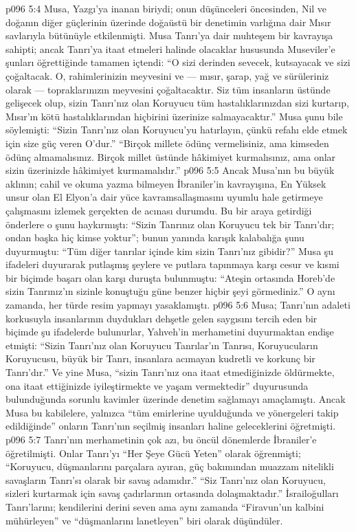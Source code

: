 \vs p096 5:4 Musa, Yazgı’ya inanan biriydi; onun düşünceleri öncesinden, Nil ve doğanın diğer güçlerinin üzerinde doğaüstü bir denetimin varlığına dair Mısır savlarıyla bütünüyle etkilenmişti. Musa Tanrı’ya dair muhteşem bir kavrayışa sahipti; ancak Tanrı’ya itaat etmeleri halinde olacaklar hususunda Museviler’e şunları öğrettiğinde tamamen içtendi: “O sizi derinden sevecek, kutsayacak ve sizi çoğaltacak. O, rahimlerinizin meyvesini ve --- mısır, şarap, yağ ve sürüleriniz olarak --- topraklarınızın meyvesini çoğaltacaktır. Siz tüm insanların üstünde gelişecek olup, sizin Tanrı’nız olan Koruyucu tüm hastalıklarınızdan sizi kurtarıp, Mısır’ın kötü hastalıklarından hiçbirini üzerinize salmayacaktır.” Musa şunu bile söylemişti: “Sizin Tanrı’nız olan Koruyucu’yu hatırlayın, çünkü refahı elde etmek için size güç veren O’dur.” “Birçok millete ödünç vermelisiniz, ama kimseden ödünç almamalısınız. Birçok millet üstünde hâkimiyet kurmalısınız, ama onlar sizin üzerinizde hâkimiyet kurmamalıdır.”
\vs p096 5:5 Ancak Musa’nın bu büyük aklının; cahil ve okuma yazma bilmeyen İbraniler’in kavrayışına, En Yüksek unsur olan El Elyon’a dair yüce kavramsallaşmasını uyumlu hale getirmeye çalışmasını izlemek gerçekten de acınası durumdu. Bu bir araya getirdiği önderlere o şunu haykırmıştı: “Sizin Tanrınız olan Koruyucu tek bir Tanrı’dır; ondan başka hiç kimse yoktur”; bunun yanında karışık kalabalığa şunu duyurmuştu: “Tüm diğer tanrılar içinde kim sizin Tanrı’nız gibidir?” Musa şu ifadeleri duyurarak putlaşmış şeylere ve putlara tapınmaya karşı cesur ve kısmi bir biçimde başarı olan karşı duruşta bulunmuştu: “Ateşin ortasında Horeb’de sizin Tanrınız’ın sizinle konuştuğu güne benzer hiçbir şeyi görmediniz.” O aynı zamanda, her türde resim yapmayı yasaklamıştı.
\vs p096 5:6 Musa; Tanrı’nın adaleti korkusuyla insanlarının duydukları dehşetle gelen saygısını tercih eden bir biçimde şu ifadelerde bulunurlar, Yahveh’in merhametini duyurmaktan endişe etmişti: “Sizin Tanrı’nız olan Koruyucu Tanrılar’ın Tanrısı, Koruyucuların Koruyucusu, büyük bir Tanrı, insanlara acımayan kudretli ve korkunç bir Tanrı’dır.” Ve yine Musa, “sizin Tanrı’nız ona itaat etmediğinizde öldürmekte, ona itaat ettiğinizde iyileştirmekte ve yaşam vermektedir” duyurusunda bulunduğunda sorunlu kavimler üzerinde denetim sağlamayı amaçlamıştı. Ancak Musa bu kabilelere, yalnızca “tüm emirlerine uyulduğunda ve yönergeleri takip edildiğinde” onların Tanrı’nın seçilmiş insanları haline geleceklerini öğretmişti.
\vs p096 5:7 Tanrı’nın merhametinin çok azı, bu öncül dönemlerde İbraniler’e öğretilmişti. Onlar Tanrı’yı “Her Şeye Gücü Yeten” olarak öğrenmişti; “Koruyucu, düşmanlarını parçalara ayıran, güç bakımından muazzam nitelikli savaşların Tanrı’sı olarak bir savaş adamıdır.” “Siz Tanrı’nız olan Koruyucu, sizleri kurtarmak için savaş çadırlarının ortasında dolaşmaktadır.” İsrailoğulları Tanrı’larını; kendilerini derini seven ama aynı zamanda “Firavun’un kalbini mühürleyen” ve “düşmanlarını lanetleyen” biri olarak düşündüler.
